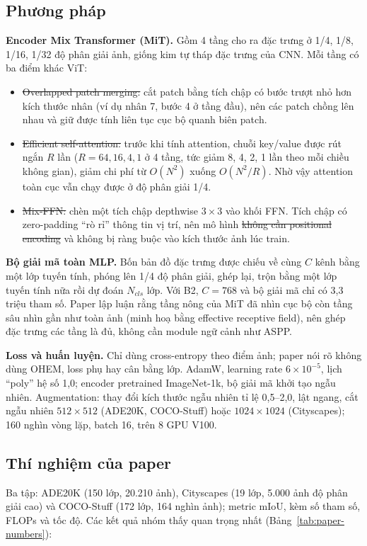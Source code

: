 \subsection{Phương pháp}
\textbf{Encoder Mix Transformer (MiT).} Gồm 4 tầng cho ra đặc trưng ở 1/4, 1/8, 1/16, 1/32 độ phân giải ảnh, giống kim
tự tháp đặc trưng của CNN. Mỗi tầng có ba điểm khác ViT:
\begin{itemize}
  \item \st{Overlapped patch merging:} cắt patch bằng tích chập có bước trượt nhỏ hơn kích thước nhân (ví dụ nhân 7, bước 4
        ở tầng đầu), nên các patch chồng lên nhau và giữ được tính liên tục cục bộ quanh biên patch.
  \item \st{Efficient self-attention:} trước khi tính attention, chuỗi key/value được rút ngắn $R$ lần ($R = 64, 16, 4, 1$
        ở 4 tầng, tức giảm 8, 4, 2, 1 lần theo mỗi chiều không gian), giảm chi phí từ $O(N^2)$ xuống $O(N^2/R)$. Nhờ vậy attention toàn cục vẫn
        chạy được ở độ phân giải 1/4.
  \item \st{Mix-FFN:} chèn một tích chập depthwise $3\times3$ vào khối FFN. Tích chập có zero-padding ``rò rỉ'' thông tin
        vị trí, nên mô hình \st{không cần positional encoding} và không bị ràng buộc vào kích thước ảnh lúc train.
\end{itemize}
\textbf{Bộ giải mã toàn MLP.} Bốn bản đồ đặc trưng được chiếu về cùng $C$ kênh bằng một lớp tuyến tính, phóng lên 1/4 độ
phân giải, ghép lại, trộn bằng một lớp tuyến tính nữa rồi dự đoán $N_{cls}$ lớp. Với B2, $C = 768$ và bộ giải mã chỉ có
3,3 triệu tham số. Paper lập luận rằng tầng nông của MiT đã nhìn cục bộ còn tầng sâu nhìn gần như toàn ảnh (minh hoạ
bằng effective receptive field), nên ghép đặc trưng các tầng là đủ, không cần module ngữ cảnh như ASPP.

\textbf{Loss và huấn luyện.} Chỉ dùng cross-entropy theo điểm ảnh; paper nói rõ không dùng OHEM, loss phụ hay cân bằng lớp.
AdamW, learning rate $6\times10^{-5}$, lịch ``poly'' hệ số 1,0; encoder pretrained ImageNet-1k, bộ giải mã khởi tạo ngẫu
nhiên. Augmentation: thay đổi kích thước ngẫu nhiên tỉ lệ 0,5--2,0, lật ngang, cắt ngẫu nhiên $512\times512$ (ADE20K,
COCO-Stuff) hoặc $1024\times1024$ (Cityscapes); 160 nghìn vòng lặp, batch 16, trên 8 GPU V100.

\subsection{Thí nghiệm của paper}
Ba tập: ADE20K (150 lớp, 20.210 ảnh), Cityscapes (19 lớp, 5.000 ảnh độ phân giải cao) và COCO-Stuff (172 lớp, 164 nghìn
ảnh); metric mIoU, kèm số tham số, FLOPs và tốc độ. Các kết quả nhóm thấy quan trọng nhất (Bảng~\ref{tab:paper-numbers}):

